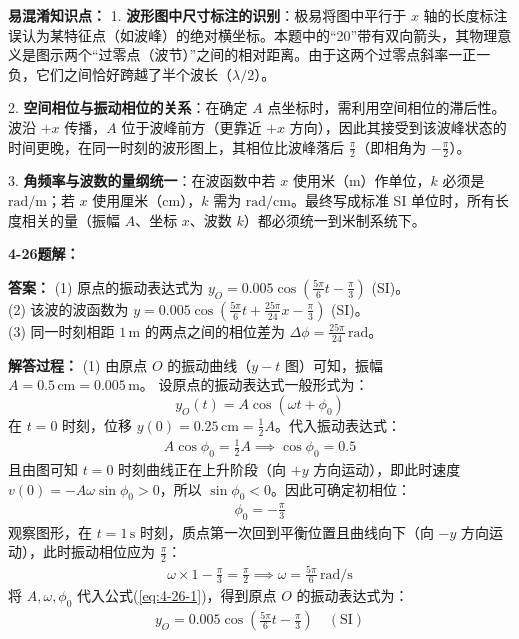 \textbf{易混淆知识点： }
1. \textbf{波形图中尺寸标注的识别}：极易将图中平行于 $x$ 轴的长度标注误认为某特征点（如波峰）的绝对横坐标。本题中的“20”带有双向箭头，其物理意义是图示两个“过零点（波节）”之间的相对距离。由于这两个过零点斜率一正一负，它们之间恰好跨越了半个波长（$\lambda/2$）。

2. \textbf{空间相位与振动相位的关系}：在确定 $A$ 点坐标时，需利用空间相位的滞后性。波沿 $+x$ 传播，$A$ 位于波峰前方（更靠近 $+x$ 方向），因此其接受到该波峰状态的时间更晚，在同一时刻的波形图上，其相位比波峰落后 $\frac{\pi}{2}$（即相角为 $-\frac{\pi}{2}$）。

3. \textbf{角频率与波数的量纲统一}：在波函数中若 $x$ 使用米（m）作单位，$k$ 必须是 $\text{rad/m}$；若 $x$ 使用厘米（cm），$k$ 需为 $\text{rad/cm}$。最终写成标准 SI 单位时，所有长度相关的量（振幅 $A$、坐标 $x$、波数 $k$）都必须统一到米制系统下。

\vspace{2em}

\textbf{4-26题解： }
\setcounter{equation}{0}
\renewcommand{\theHequation}{4-26.\arabic{equation}}

\textbf{答案： }
(1) 原点的振动表达式为 $y_O = 0.005 \cos(\frac{5\pi}{6}t - \frac{\pi}{3})$ (SI)。\\
(2) 该波的波函数为 $y = 0.005 \cos(\frac{5\pi}{6}t + \frac{25\pi}{24}x - \frac{\pi}{3})$ (SI)。\\
(3) 同一时刻相距 $1\,\text{m}$ 的两点之间的相位差为 $\Delta \phi = \frac{25\pi}{24}\,\text{rad}$。

\textbf{解答过程： }
(1) 由原点 $O$ 的振动曲线（$y-t$ 图）可知，振幅 $A = 0.5\,\text{cm} = 0.005\,\text{m}$。
设原点的振动表达式一般形式为：
\begin{equation}\label{eq:4-26-1}
	y_O(t) = A \cos(\omega t + \phi_0)
\end{equation}
在 $t = 0$ 时刻，位移 $y(0) = 0.25\,\text{cm} = \frac{1}{2}A$。代入振动表达式：
\begin{align*}
	A \cos\phi_0 = \frac{1}{2}A \implies \cos\phi_0 = 0.5
\end{align*}
且由图可知 $t=0$ 时刻曲线正在上升阶段（向 $+y$ 方向运动），即此时速度 $v(0) = -A\omega\sin\phi_0 > 0$，所以 $\sin\phi_0 < 0$。因此可确定初相位：
\begin{align*}
	\phi_0 = -\frac{\pi}{3}
\end{align*}
观察图形，在 $t = 1\,\text{s}$ 时刻，质点第一次回到平衡位置且曲线向下（向 $-y$ 方向运动），此时振动相位应为 $\frac{\pi}{2}$：
\begin{align*}
	\omega \times 1 - \frac{\pi}{3} = \frac{\pi}{2} \implies \omega = \frac{5\pi}{6}\,\text{rad/s}
\end{align*}
将 $A, \omega, \phi_0$ 代入公式(\ref{eq:4-26-1})，得到原点 $O$ 的振动表达式为：
\begin{align*}
	y_O = 0.005 \cos(\frac{5\pi}{6}t - \frac{\pi}{3}) \quad (\text{SI})
\end{align*}

